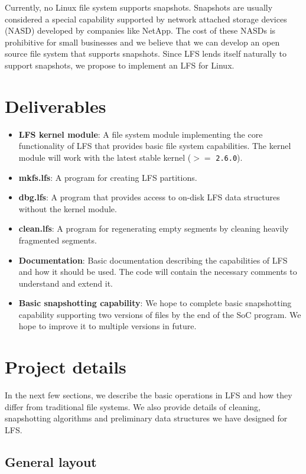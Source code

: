 \documentclass{article}
\begin{document}
Currently, no Linux file system supports snapshots. Snapshots are usually
considered a special capability supported by network attached storage devices
(NASD) developed by companies like NetApp. The cost of these NASDs is
prohibitive for small businesses and we believe that we can develop an open
source file system that supports snapshots. Since LFS lends itself naturally
to support snapshots, we propose to implement an LFS for Linux.

\section{Deliverables}
\begin{itemize}
\item
\textbf{LFS kernel module}:
A file system module implementing the core functionality of LFS that provides basic
file system capabilities. The kernel module will work with the latest stable
kernel ($>=$ \texttt{2.6.0}).
\item
\textbf{mkfs.lfs}:
A program for creating LFS partitions.
\item
\textbf{dbg.lfs}:
A program that provides access to on-disk LFS data structures without the
kernel module.
\item
\textbf{clean.lfs}:
A program for regenerating empty segments by cleaning heavily fragmented
segments.
\item
\textbf{Documentation}:
Basic documentation describing the capabilities of LFS and how it should be
used. The code will contain the necessary comments to understand and extend
it.
\item
\textbf{Basic snapshotting capability}:
We hope to complete basic snapshotting capability supporting two versions of
files by the end of the SoC program. We hope to improve it to multiple
versions in future.
\end{itemize}

\section{Project details}
In the next few sections, we describe the basic operations in LFS and how
they differ from traditional file systems. We also provide details of
cleaning, snapshotting algorithms and preliminary data structures we have 
designed for LFS.

\subsection{General layout}
\end{document}
